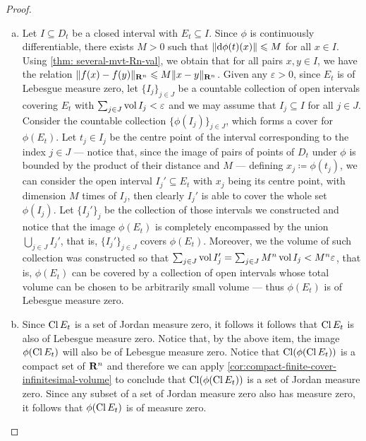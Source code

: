 \begin{proof}
    \begin{enumerate}[(a)]\setlength\itemsep{0em}
        \item Let \(I \subseteq D_t\) be a closed interval with \(E_t \subseteq
              I\). Since \(\phi\) is continuously differentiable, there exists \(M > 0\) such
              that \(\lVert\mathrm{d} \phi(t)(x)\rVert \leqslant M\) for all \(x \in I\). Using \cref{thm:
                  several-mvt-Rn-val}, we obtain that for all pairs \(x, y \in I\), we have the
              relation \(\lVert f(x) - f(y)\rVert_{\mathbf{R}^n} \leqslant M \lVert x - y\rVert_{\mathbf{R}^n}\). Given any
              \(\varepsilon > 0\), since \(E_t\) is of Lebesgue measure zero, let
              \(\{I_{j}\}_{j \in J}\) be a countable collection of open intervals covering
              \(E_t\) with \(\sum_{j \in J} \operatorname{vol} I_j < \varepsilon\) and we may assume that
              \(I_j \subseteq I\) for all \(j \in J\). Consider the countable collection
              \(\{\phi(I_{j})\}_{j \in J}\), which forms a cover for \(\phi(E_t)\). Let \(t_j
              \in I_j\) be the centre point of the interval corresponding to the index \(j \in
              J\) --- notice that, since the image of pairs of points of \(D_t\) under
              \(\phi\) is bounded by the product of their distance and \(M\) --- defining
              \(x_j \coloneq \phi(t_j)\), we can consider the open interval \(I_j' \subseteq
              E_t\) with \(x_j\) being its centre point, with dimension \(M\) times of
              \(I_j\), then clearly \(I_j'\) is able to cover the whole set \(\phi(I_j)\). Let
              \(\{I_{j}'\}_j\) be the collection of those intervals we constructed and notice
              that the image \(\phi(E_t)\) is completely encompassed by the union \(\bigcup_{j
                  \in J} I_j'\), that is, \(\{I_{j}'\}_{j \in J}\) covers \(\phi(E_t)\). Moreover,
              we the volume of such collection was constructed so that \(\sum_{j \in J} \operatorname{vol}
              I_j' = \sum_{j \in J} M^n \operatorname{vol} I_j < M^n \varepsilon\), that is, \(\phi(E_t)\)
              can be covered by a collection of open intervals whose total volume can be
              chosen to be arbitrarily small volume --- thus \(\phi(E_t)\) is of Lebesgue
              measure zero.

        \item Since \(\operatorname{Cl} E_t\) is a set of Jordan measure zero, it follows it
              follows that \(\operatorname{Cl} E_t\) is also of Lebesgue measure zero. Notice that,
              by the above item, the image \(\phi(\operatorname{Cl} E_t)\) will also be of Lebesgue
              measure zero. Notice that \(\operatorname{Cl}(\phi(\operatorname{Cl} E_t))\) is a compact set
              of \(\mathbf{R}^n\) and therefore we can apply
              \cref{cor:compact-finite-cover-infinitesimal-volume} to conclude that
              \(\operatorname{Cl}(\phi(\operatorname{Cl} E_t))\) is a set of Jordan measure zero. Since any
              subset of a set of Jordan measure zero also has measure zero, it follows that
              \(\phi(\operatorname{Cl} E_t)\) is of measure zero.


\end{enumerate}
\end{proof}

